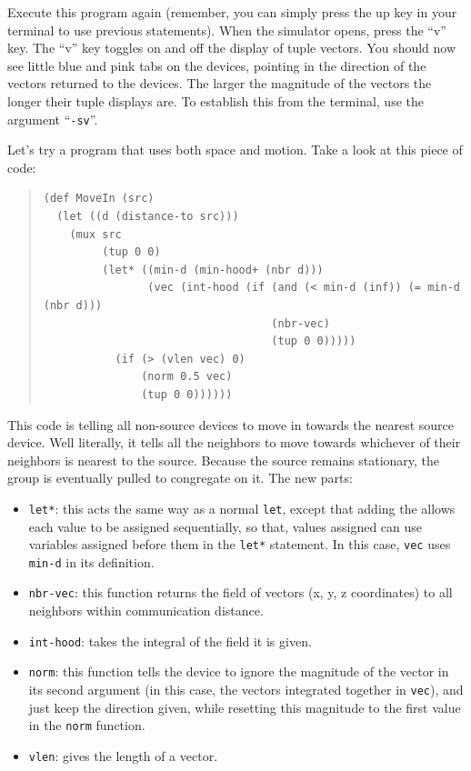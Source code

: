 \documentclass{article}
\newcommand\var[1]{{\tt #1}}
\newcommand\qvar[1]{``{\tt #1}''}
\begin{document}
Execute this program again (remember, you can simply press the up key
in your terminal to use previous statements).  When the simulator
opens, press the ``v'' key.  The ``v'' key toggles on and off the
display of tuple vectors.  You should now see little blue and pink
tabs on the devices, pointing in the direction of the vectors returned
to the devices.  The larger the magnitude of the vectors the longer
their tuple displays are.  To establish this from the terminal, use
the argument \qvar{-sv}.

Let's try a program that uses both space and motion. Take a look at
this piece of code:

\begin{quote}
\begin{verbatim}
(def MoveIn (src)
  (let ((d (distance-to src)))
    (mux src
         (tup 0 0)
         (let* ((min-d (min-hood+ (nbr d)))
                (vec (int-hood (if (and (< min-d (inf)) (= min-d (nbr d)))
                                   (nbr-vec)
                                   (tup 0 0)))))
           (if (> (vlen vec) 0)
               (norm 0.5 vec) 
               (tup 0 0))))))
\end{verbatim}
\end{quote}

This code is telling all non-source devices to move in towards the
nearest source device.  Well literally, it tells all the neighbors to
move towards whichever of their neighbors is nearest to the source.
Because the source remains stationary, the group is eventually pulled
to congregate on it.  The new parts:
\begin{itemize}
\item \var{let*}: this acts the same way as a normal \var{let}, except
  that adding the \var{*} allows each value to be assigned
  sequentially, so that, values assigned can use variables assigned
  before them in the \var{let*} statement.  In this case, \var{vec}
  uses \var{min-d} in its definition.
\item \var{nbr-vec}: this function returns the field of vectors (x, y,
  z coordinates) to all neighbors within communication distance.
\item \var{int-hood}: takes the integral of the field it is given.
\item \var{norm}: this function tells the device to ignore the
  magnitude of the vector in its second argument (in this case, the
  vectors integrated together in \var{vec}), and just keep the
  direction given, while resetting this magnitude to the first value
  in the \var{norm} function.
\item \var{vlen}: gives the length of a vector.
\end{itemize}
\end{document}
